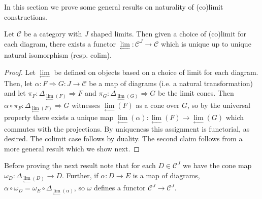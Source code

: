 In this section we prove some general results on naturality of (co)limit constructions.

\begin{lem}[label=lem:limFunctor]
    Let $\mathcal{C}$ be a category with $J$ shaped limits. Then given a choice of (co)limit for each diagram, there exists a functor $\lim\limits_{\leftarrow}:\mathcal{C}^J\rightarrow \mathcal{C}$ which is unique up to unique natural isomorphism (resp. $\text{colim}$).
\end{lem}
\begin{proof}
    Let $\lim\limits_{\leftarrow}$ be defined on objects based on a choice of limit for each diagram. Then, let $\alpha:F\Rightarrow G:J\rightarrow \mathcal{C}$ be a map of diagrams (i.e. a natural transformation) and let $\pi_F:\Delta_{\lim\limits_{\leftarrow}(F)}\Rightarrow F$ and $\pi_G:\Delta_{\lim\limits_{\leftarrow}(G)}\Rightarrow G$ be the limit cones. Then $\alpha\circ \pi_F:\Delta_{\lim\limits_{\leftarrow}(F)}\Rightarrow G$ witnesses $\lim\limits_{\leftarrow}(F)$ as a cone over $G$, so by the universal property there exists a unique map $\lim\limits_{\leftarrow}(\alpha):\lim\limits_{\leftarrow}(F)\rightarrow \lim\limits_{\leftarrow}(G)$ which commutes with the projections. By uniqueness this assignment is functorial, as desired. The colimit case follows by duality. The second claim follows from a more general result which we show next.
\end{proof}

Before proving the next result note that for each $D \in \mathcal{C}^J$ we have the cone map $\omega_D:\Delta_{\lim\limits_{\leftarrow}(D)}\to D$. Further, if $\alpha:D\to E$ is a map of diagrams, $\alpha\circ \omega_D = \omega_E\circ \Delta_{\lim\limits_{\leftarrow}(\alpha)}$, so $\omega$ defines a functor $\mathcal{C}^J\to \mathcal{C}^J$.

